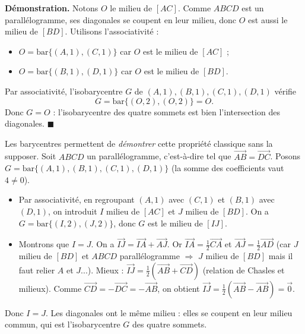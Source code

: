 \documentclass[11pt]{article}
\begin{document}
\textbf{Démonstration.} Notons $O$ le milieu de $[AC]$. Comme $ABCD$ est un parallélogramme, ses diagonales se coupent en leur milieu, donc $O$ est aussi le milieu de $[BD]$. Utilisons l'associativité :
\begin{itemize}
\item $O=\mathrm{bar}\{(A,1),(C,1)\}$ car $O$ est le milieu de $[AC]$ ;
\item $O=\mathrm{bar}\{(B,1),(D,1)\}$ car $O$ est le milieu de $[BD]$.
\end{itemize}
Par associativité, l'isobarycentre $G$ de $(A,1),(B,1),(C,1),(D,1)$ vérifie
\[
G=\mathrm{bar}\{(O,2),(O,2)\}=O.
\]
Donc $G=O$ : l'isobarycentre des quatre sommets est bien l'intersection des diagonales. $\blacksquare$

\begin{exemplebox}
Les barycentres permettent de \emph{démontrer} cette propriété classique sans la supposer. Soit $ABCD$ un parallélogramme, c'est-à-dire tel que $\overrightarrow{AB}=\overrightarrow{DC}$. Posons $G=\mathrm{bar}\{(A,1),(B,1),(C,1),(D,1)\}$ (la somme des coefficients vaut $4\neq 0$).
\begin{itemize}
\item Par associativité, en regroupant $(A,1)$ avec $(C,1)$ et $(B,1)$ avec $(D,1)$, on introduit $I$ milieu de $[AC]$ et $J$ milieu de $[BD]$. On a $G=\mathrm{bar}\{(I,2),(J,2)\}$, donc $G$ est le milieu de $[IJ]$.
\item Montrons que $I=J$. On a $\overrightarrow{IJ}=\overrightarrow{IA}+\overrightarrow{AJ}$. Or $\overrightarrow{IA}=\frac{1}{2}\overrightarrow{CA}$ et $\overrightarrow{AJ}=\frac{1}{2}\overrightarrow{AD}$ (car $J$ milieu de $[BD]$ et $ABCD$ parallélogramme $\Rightarrow$ $J$ milieu de $[BD]$ mais il faut relier $A$ et $J$...). 
Mieux : $\overrightarrow{IJ} = \frac{1}{2}(\overrightarrow{AB}+\overrightarrow{CD})$ (relation de Chasles et milieux). Comme $\overrightarrow{CD}=-\overrightarrow{DC}=-\overrightarrow{AB}$, on obtient $\overrightarrow{IJ}=\frac{1}{2}(\overrightarrow{AB}-\overrightarrow{AB})=\vec{0}$.
\end{itemize}
Donc $I=J$. Les diagonales ont le même milieu : elles se coupent en leur milieu commun, qui est l'isobarycentre $G$ des quatre sommets.
\end{exemplebox}
\end{document}
